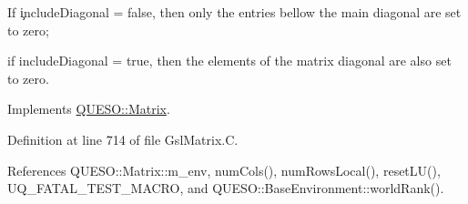 \begin{DoxyVerb}If \c includeDiagonal = false, then only the entries bellow the main diagonal are set to zero; 
\end{DoxyVerb}
 if {\ttfamily include\-Diagonal} = true, then the elements of the matrix diagonal are also set to zero. 

Implements \hyperlink{class_q_u_e_s_o_1_1_matrix_a11cb54db37379985df41e44e410e857f}{Q\-U\-E\-S\-O\-::\-Matrix}.



Definition at line 714 of file Gsl\-Matrix.\-C.



References Q\-U\-E\-S\-O\-::\-Matrix\-::m\-\_\-env, num\-Cols(), num\-Rows\-Local(), reset\-L\-U(), U\-Q\-\_\-\-F\-A\-T\-A\-L\-\_\-\-T\-E\-S\-T\-\_\-\-M\-A\-C\-R\-O, and Q\-U\-E\-S\-O\-::\-Base\-Environment\-::world\-Rank().


